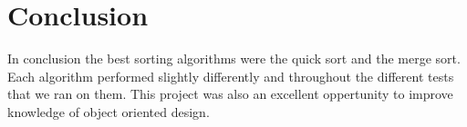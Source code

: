 \documentclass[12pt]{report}
\begin{document}
\section*{Conclusion}
	In conclusion the best sorting algorithms were the quick sort and the 
	merge sort. Each algorithm performed slightly differently and throughout
	the different tests that we ran on them. This project was also an excellent
	oppertunity to improve knowledge of object oriented design.
\end{document}

